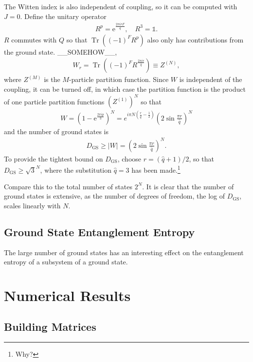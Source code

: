 \documentclass[12pt]{article} %
\newcommand{\abs}[1]{\left|#1\right|}
\renewcommand{\th}[1]{\frac{1}{#1}}
\newcommand{\e}{\text{e}}
\DeclareMathOperator{\Tr}{Tr}
\begin{document}
The Witten index is also independent of coupling, so it can be computed with $J=0$. Define the unitary operator 
\begin{align}
R^p = \e^{\frac{2\pi irF}{\hat q}},\quad R^3 = \mathbb{1}.
\end{align}
$R$ commutes with $Q$ so that $\Tr\left((-1)^FR^p\right)$ also only has contributions from the ground state. \_\_SOMEHOW\_\_,
\begin{align}
W_r = \Tr\left((-1)^FR^\frac{2\pi ir}{\hat q}\right) \equiv Z^{(N)},
\end{align}
where $Z^{(M)}$ is the $M$-particle partition function. Since $W$ is independent of the coupling, it can be turned off, in which case the partition function is the product of one particle partition functions $\left(Z^{(1)}\right)^N$ so that 
\begin{align}
W = \left(1-\e^{\frac{2\pi ip}{3}}\right)^N = e^{i\pi N\left(\frac{r}{\hat q} - \th{2}\right)}\left(2\sin\frac{\pi r}{\hat q}\right)^N
\end{align}
and the number of ground states is 
\begin{align}
D_\text{GS} \ge \abs{W} = \left(2\sin\frac{\pi r}{\hat q}\right)^N.
\end{align}
To provide the tightest bound on $D_\text{GS}$, choose $r = (\hat q+1)/2$, so that $D_\text{GS} \ge \sqrt{3}^N$, where the substitution $\hat q = 3$ has been made.\footnote{Why?}

Compare this to the total number of states $2^N$. It is clear that the number of ground states is extensive, as the number of degrees of freedom, the log of $D_\text{GS}$, scales linearly with $N$.

\subsection{Ground State Entanglement Entropy} \emph{}

The large number of ground states has an interesting effect on the entanglement entropy of a subsystem of a ground state.

\section{Numerical Results}

\subsection{Building Matrices}\emph{}
\end{document}

